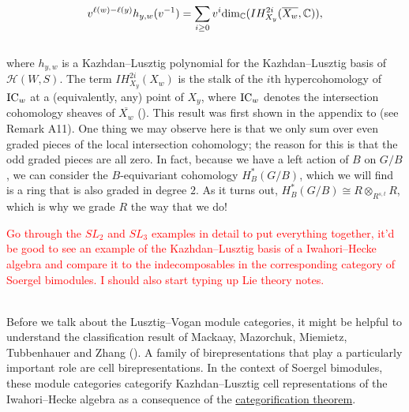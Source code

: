\begin{remark}
\begin{align*}
\begin{split}
v^{\ell(w) - \ell(y)} h_{y,w}(v^{-1}) = \sum_{i \geq 0} v^i \textup{dim}_\mathbb{C}(IH^{2i}_{X_y}(\overline{X_w}, \mathbb{C})),
\end{split}
\end{align*}
\noindent\\[-0.7\linespacing] where $h_{y,w}$ is a Kazhdan--Lusztig polynomial for the Kazhdan--Lusztig basis of $\mathscr{H}(W, S)$. The term $IH^{2i}_{X_y}(X_w)$ is the stalk of the $i$th hypercohomology of $\textup{IC}_w$ at a (equivalently, any) point of $X_y$, where $\textup{IC}_w$ denotes the intersection cohomology sheaves of $\overline{X_w}$ (\cite[Theorem 13.13]{EMTW20}). This result was first shown in the appendix to \cite{KL79} (see Remark A11). One thing we may observe here is that we only sum over even graded pieces of the local intersection cohomology; the reason for this is that the odd graded pieces are all zero. In fact, because we have a left action of $B$ on $G/B$, we can consider the $B$-equivariant cohomology $H_B^*(G/B)$, which we will find is a ring that is also graded in degree $2$. As it turns out, $H_B^*(G/B) \cong R \otimes_{R^{s,t}} R$, which is why we grade $R$ the way that we do!\newpage
\end{remark}

\noindent\textcolor{red}{Go through the $SL_2$ and $SL_3$ examples in detail to put everything together, it'd be good to see an example of the Kazhdan--Lusztig basis of a Iwahori--Hecke algebra and compare it to the indecomposables in the corresponding category of Soergel bimodules. I should also start typing up Lie theory notes.}\\
\newpage

\noindent 

\newpage

\noindent\\ Before we talk about the Lusztig--Vogan module categories, it might be helpful to understand the classification result of Mackaay, Mazorchuk, Miemietz, Tubbenhauer and Zhang (\cite{MMMTZ23}). A family of birepresentations that play a particularly important role are cell birepresentations. In the context of Soergel bimodules, these module categories categorify Kazhdan--Lusztig cell representations of the Iwahori--Hecke algebra as a consequence of the \hyperref[SoergelConjecture]{categorification theorem}.\\

